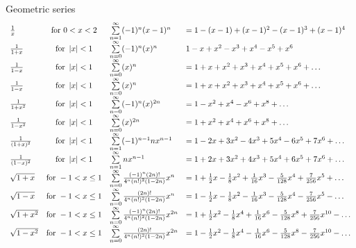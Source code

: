 \begin{framed}
 Geometric series
 \[
    \begin{array}{l  c  l l}
      \frac{1}{x}
      & \text{for } 0 < x < 2 
      & \sum\limits_{n=1}^{\infty} (-1)^n (x-1)^n
      & = 1 - (x - 1) + (x-1)^2 - (x-1)^3 + (x-1)^4\\
      \frac{1}{1+x}
      & \text{for } \left| x \right| < 1
      & \sum\limits_{n=0}^{\infty} (-1)^n (x)^n
      & 1 -x + x^2 - x^3 + x^4 -x^5 + x^6 \\
      \frac{1}{1-x}
      & \text{for } \left| x \right| < 1
      & \sum\limits_{n=0}^{\infty} (x)^n
      &= 1 + x + x^2 + x^3 + x^4 + x^5 + x^6 + \hdots\\
      \frac{1}{1-x}
      & \text{for } \left| x \right| < 1
      & \sum\limits_{n=0}^{\infty} (x)^n
      &= 1 + x + x^2 + x^3 + x^4 + x^5 + x^6 + \hdots\\
      \frac{1}{1+x^2}
      & \text{for } \left| x \right| < 1
      & \sum\limits_{n=0}^{\infty} (-1)^n (x)^{2n}
      &= 1 -x^2 + x^4 - x^6 + x^8  + \hdots\\
      \frac{1}{1-x^2}
      & \text{for } \left| x \right| < 1
      & \sum\limits_{n=0}^{\infty} (x)^{2n}
      &= 1 +x^2 + x^4 + x^6 + x^8  + \hdots\\
      \frac{1}{(1+x)^2}
      & \text{for } \left| x \right| < 1
      & \sum\limits_{n=1}^{\infty} (-1)^{n-1} nx^{n-1}
      &= 1 -2x + 3x^2 -4x^3 + 5x^4 - 6x^5 + 7x^6  + \hdots\\
      \frac{1}{(1-x)^2}
      & \text{for } \left| x \right| < 1
      & \sum\limits_{n=1}^{\infty}  nx^{n-1}
      &= 1 +2x + 3x^2 +4x^3 + 5x^4 + 6x^5 + 7x^6  + \hdots\\
      \sqrt{1 + x}
      & \text{for } -1 < x \leq 1
      & \sum\limits_{n=0}^{\infty} \frac{(-1)^n (2n)!}{4^n (n!)^2 (1-2n)}  x^n
      &=  1 + \frac{1}{2}x - \frac{1}{8}x^2 + \frac{1}{16}x^3 - \frac{5}{128}x^4 + \frac{7}{256}x^5 + \hdots\\
      \sqrt{1 - x}
      & \text{for } -1 < x \leq 1
      & \sum\limits_{n=0}^{\infty} \frac{ (2n)!}{4^n (n!)^2 (1-2n)}  x^n
      &=  1 - \frac{1}{2}x - \frac{1}{8}x^2 - \frac{1}{16}x^3 - \frac{5}{128}x^4 - \frac{7}{256}x^5 - \hdots\\
      \sqrt{1 + x^2}
      & \text{for } -1 < x \leq 1
      & \sum\limits_{n=0}^{\infty} \frac{ (-1)^n (2n)!}{4^n (n!)^2 (1-2n)}  x^{2n}
      &=  1 + \frac{1}{2}x^2 - \frac{1}{8}x^4 + \frac{1}{16}x^6 - \frac{5}{128}x^8 + \frac{7}{256}x^{10} - \hdots\\
      \sqrt{1 - x^2}
      & \text{for } -1 < x \leq 1
      & \sum\limits_{n=0}^{\infty} \frac{ (2n)!}{4^n (n!)^2 (1-2n)}  x^{2n}
      &=  1 - \frac{1}{2}x^2 - \frac{1}{8}x^4 - \frac{1}{16}x^6 - \frac{5}{128}x^8 - \frac{7}{256}x^{10} - \hdots\\
   \end{array}
 \] 


\end{framed}
